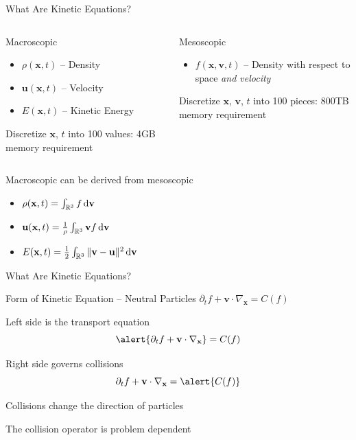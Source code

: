 \documentclass{beamer}
\renewcommand{\vec}[1]{\ensuremath{\mathbf{#1}}}
\newcommand{\R}{\ensuremath{\mathbb{R}}\xspace}
\begin{document}
    \begin{frame}{What Are Kinetic Equations?}
        \begin{columns}[t]
            \begin{block}{Macroscopic}
                \begin{itemize}
                    \item $\rho(\vec{x},t)$ -- Density
                    \item $\vec{u}(\vec{x},t)$ -- Velocity
                    \item $E(\vec{x},t)$ -- Kinetic Energy
                \end{itemize}
                Discretize \vec{x}, $t$ into 100 values: 4GB memory requirement
            \end{block}
            \begin{block}{Mesoscopic}
                \begin{itemize}
                    \item $f(\vec{x},\vec{v},t)$ -- Density with respect to space \emph{and velocity}
                \end{itemize}
                Discretize \vec{x}, \vec{v}, $t$ into 100 pieces: 800TB memory requirement
            \end{block}
        \end{columns}

        \vfill

        Macroscopic can be derived from mesoscopic
        \begin{itemize}
            \item $\rho(\vec{x},t) = \int_{\R^3} f \dif \vec{v}$
            \item $\vec{u}(\vec{x},t) = \frac{1}{\rho} \int_{\R^3} \vec{v}f \dif \vec{v}$
            \item $E(\vec{x},t) = \frac{1}{2} \int_{\R^3} \| \vec{v} - \vec{u} \|^2 \dif \vec{v}$
        \end{itemize}
    \end{frame}

    \begin{frame}{What Are Kinetic Equations?}
        \begin{block}{Form of Kinetic Equation -- Neutral Particles}
            $\partial_t f + \vec{v} \cdot \nabla_\vec{x} = C(f)$
        \end{block}

        \vfill

        Left side is the transport equation
        \[\alert{\partial_t f + \vec{v} \cdot \nabla_\vec{x}} = C(f)\]

        \vfill

        Right side governs collisions
        \[\partial_t f + \vec{v} \cdot \nabla_\vec{x} = \alert{C(f)}\]
        \vfill

        Collisions change the direction of particles

        The collision operator is problem dependent
    \end{frame}
\end{document}
